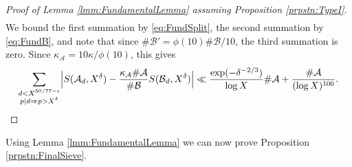\documentclass[10pt]{amsart}
\theoremstyle{plain}
\numberwithin{sblmm}{thrm}
\numberwithin{equation}{section}
\begin{document}
\begin{proof}[Proof of Lemma \ref{lmm:FundamentalLemma} assuming Proposition \ref{prpstn:TypeI}]
\begin{align*}
\end{align*}
%
We bound the first summation by \eqref{eq:FundSplit}, the second summation by \eqref{eq:FundB}, and note that since $\#\mathcal{B}'=\phi(10)\#\mathcal{B}{}/10$, the third summation is zero. Since $\kappa_\mathcal{A}=10\kappa/\phi(10)$, this gives
\[
\sum_{\substack{d<X^{50/77-\epsilon}\\ p|d\Rightarrow p>X^{\delta}}}\Bigl|S(\mathcal{A}{}_{d},X^{\delta})-\frac{\kappa_\mathcal{A}\#\mathcal{A}{}}{\#\mathcal{B}{}}S(\mathcal{B}{}_d,X^{\delta})\Bigr|\ll \frac{\exp(-\delta^{-2/3})}{\log{X}}\#\mathcal{A}+\frac{\#\mathcal{A}}{(\log{X})^{100}}.
\qedhere
\]
%
\end{proof}
%
%
%
%
Using Lemma \ref{lmm:FundamentalLemma} we can now prove Proposition \ref{prpstn:FinalSieve}.
%
%
%
%
\end{document}
